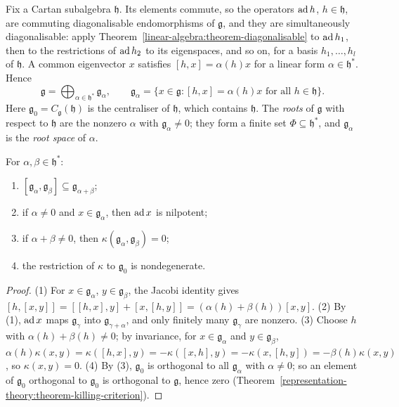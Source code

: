 Fix a Cartan subalgebra $\mathfrak{h}$. Its elements commute, so the operators $\operatorname{ad} h$, $h \in \mathfrak{h}$, are commuting diagonalisable endomorphisms of $\mathfrak{g}$, and they are
simultaneously diagonalisable: apply Theorem~\ref{linear-algebra:theorem-diagonalisable} to $\operatorname{ad} h_1$, then to the restrictions of $\operatorname{ad} h_2$ to its eigenspaces, and so on, for a
basis $h_1, \ldots, h_l$ of $\mathfrak{h}$. A common eigenvector $x$ satisfies $[h, x] = \alpha(h)x$ for a linear form $\alpha \in \mathfrak{h}^*$. Hence
\[
\mathfrak{g} = \bigoplus_{\alpha \in \mathfrak{h}^*}\mathfrak{g}_\alpha, \qquad \mathfrak{g}_\alpha = \{x \in \mathfrak{g} : [h, x] = \alpha(h)x \text{ for all } h \in \mathfrak{h}\}.
\]
Here $\mathfrak{g}_0 = C_{\mathfrak{g}}(\mathfrak{h})$ is the centraliser of $\mathfrak{h}$, which contains $\mathfrak{h}$. The \emph{roots} of $\mathfrak{g}$ with respect to $\mathfrak{h}$
are the nonzero $\alpha$ with $\mathfrak{g}_\alpha \neq 0$; they form a finite set $\Phi \subseteq \mathfrak{h}^*$, and $\mathfrak{g}_\alpha$ is the \emph{root space} of $\alpha$.

\begin{proposition}\label{representation-theory:proposition-root-spaces}
For $\alpha, \beta \in \mathfrak{h}^*$:
\begin{enumerate}
\item $[\mathfrak{g}_\alpha, \mathfrak{g}_\beta] \subseteq \mathfrak{g}_{\alpha + \beta}$;
\item if $\alpha \neq 0$ and $x \in \mathfrak{g}_\alpha$, then $\operatorname{ad} x$ is nilpotent;
\item if $\alpha + \beta \neq 0$, then $\kappa(\mathfrak{g}_\alpha, \mathfrak{g}_\beta) = 0$;
\item the restriction of $\kappa$ to $\mathfrak{g}_0$ is nondegenerate.
\end{enumerate}
\end{proposition}

\begin{proof}
(1) For $x \in \mathfrak{g}_\alpha$, $y \in \mathfrak{g}_\beta$, the Jacobi identity gives $[h, [x, y]] = [[h, x], y] + [x, [h, y]] = (\alpha(h) + \beta(h))[x, y]$. (2) By (1),
$\operatorname{ad} x$ maps $\mathfrak{g}_\gamma$ into $\mathfrak{g}_{\gamma + \alpha}$, and only finitely many $\mathfrak{g}_\gamma$ are nonzero. (3) Choose $h$ with $\alpha(h) + \beta(h) \neq 0$; by
invariance, for $x \in \mathfrak{g}_\alpha$ and $y \in \mathfrak{g}_\beta$, $\alpha(h)\kappa(x, y) = \kappa([h, x], y) = -\kappa([x, h], y) = -\kappa(x, [h, y]) = -\beta(h)\kappa(x, y)$,
so $\kappa(x, y) = 0$. (4) By (3), $\mathfrak{g}_0$ is orthogonal to all $\mathfrak{g}_\alpha$ with $\alpha \neq 0$; so an element of $\mathfrak{g}_0$ orthogonal to $\mathfrak{g}_0$ is
orthogonal to $\mathfrak{g}$, hence zero (Theorem~\ref{representation-theory:theorem-killing-criterion}).
\end{proof}

